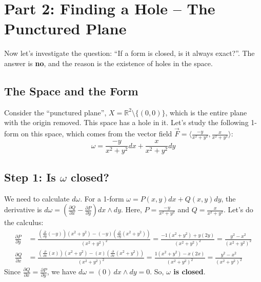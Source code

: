 \documentclass[12pt, letterpaper]{article}
\begin{document}
	\section{Part 2: Finding a Hole -- The Punctured Plane}
	
	Now let's investigate the question: ``If a form is closed, is it always exact?''. The answer is \textbf{no}, and the reason is the existence of holes in the space.
	
	\subsection{The Space and the Form}
	Consider the ``punctured plane'', $X = \mathbb{R}^2 \setminus \{(0,0)\}$, which is the entire plane with the origin removed. This space has a hole in it. Let's study the following 1-form on this space, which comes from the vector field $\vec{F} = \langle \frac{-y}{x^2+y^2}, \frac{x}{x^2+y^2} \rangle$:
	\begin{equation*}
		\omega = \frac{-y}{x^2+y^2} dx + \frac{x}{x^2+y^2} dy
	\end{equation*}
	
	\subsection{Step 1: Is $\omega$ closed?}
	We need to calculate $d\omega$. For a 1-form $\omega = P(x,y)dx + Q(x,y)dy$, the derivative is $d\omega = (\frac{\partial Q}{\partial x} - \frac{\partial P}{\partial y}) dx \wedge dy$.
	Here, $P = \frac{-y}{x^2+y^2}$ and $Q = \frac{x}{x^2+y^2}$. Let's do the calculus:
	\begin{align*}
		\frac{\partial P}{\partial y} &= \frac{(\frac{\partial}{\partial y}(-y))(x^2+y^2) - (-y)(\frac{\partial}{\partial y}(x^2+y^2))}{(x^2+y^2)^2} = \frac{-1(x^2+y^2) + y(2y)}{(x^2+y^2)^2} = \frac{y^2-x^2}{(x^2+y^2)^2} \\
		\frac{\partial Q}{\partial x} &= \frac{(\frac{\partial}{\partial x}(x))(x^2+y^2) - (x)(\frac{\partial}{\partial x}(x^2+y^2))}{(x^2+y^2)^2} = \frac{1(x^2+y^2) - x(2x)}{(x^2+y^2)^2} = \frac{y^2-x^2}{(x^2+y^2)^2}
	\end{align*}
	Since $\frac{\partial Q}{\partial x} = \frac{\partial P}{\partial y}$, we have $d\omega = (0) \, dx \wedge dy = 0$. So, \textbf{$\omega$ is closed}.
	
\end{document}
